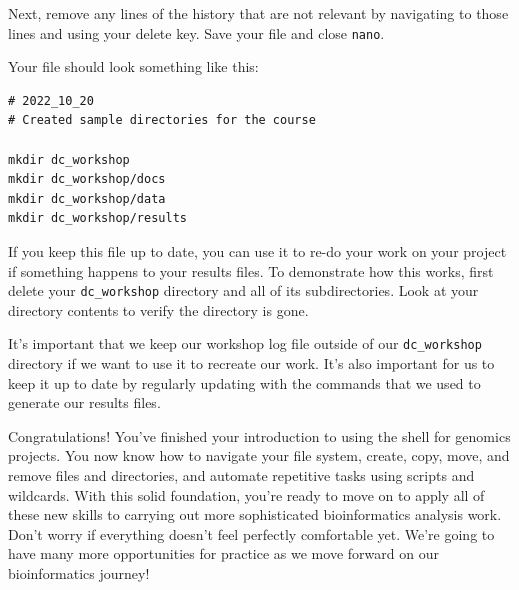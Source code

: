 \documentclass[
  letterpaper,
  DIV=11,
  numbers=noendperiod]{scrreprt}
\newenvironment{Shaded}{\begin{snugshade}}{\end{snugshade}}
\newcommand{\AttributeTok}[1]{\textcolor[rgb]{0.40,0.45,0.13}{#1}}
\newcommand{\ExtensionTok}[1]{\textcolor[rgb]{0.00,0.23,0.31}{#1}}
\newcommand{\NormalTok}[1]{\textcolor[rgb]{0.00,0.23,0.31}{#1}}
\begin{document}
Next, remove any lines of the history that are not relevant by
navigating to those lines and using your delete key. Save your file and
close \texttt{nano}.

Your file should look something like this:

\begin{verbatim}
# 2022_10_20   
# Created sample directories for the course

mkdir dc_workshop
mkdir dc_workshop/docs
mkdir dc_workshop/data
mkdir dc_workshop/results
\end{verbatim}

If you keep this file up to date, you can use it to re-do your work on
your project if something happens to your results files. To demonstrate
how this works, first delete your \texttt{dc\_workshop} directory and
all of its subdirectories. Look at your directory contents to verify the
directory is gone.

\begin{Shaded}
\end{Shaded}

\begin{Shaded}
\end{Shaded}

It's important that we keep our workshop log file outside of our
\texttt{dc\_workshop} directory if we want to use it to recreate our
work. It's also important for us to keep it up to date by regularly
updating with the commands that we used to generate our results files.

Congratulations! You've finished your introduction to using the shell
for genomics projects. You now know how to navigate your file system,
create, copy, move, and remove files and directories, and automate
repetitive tasks using scripts and wildcards. With this solid
foundation, you're ready to move on to apply all of these new skills to
carrying out more sophisticated bioinformatics analysis work. Don't
worry if everything doesn't feel perfectly comfortable yet. We're going
to have many more opportunities for practice as we move forward on our
bioinformatics journey!
\end{document}
